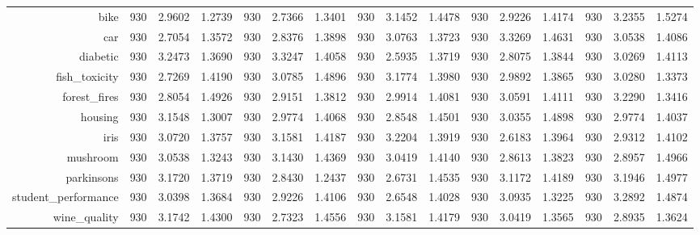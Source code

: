 \begin{table}[htbp]
{\begin{tabular}{rccccccccccccccc}
    bike  & 930   & 2.9602 & 1.2739 & 930   & \cellcolor[rgb]{ .776,  .937,  .808}\textcolor[rgb]{ 0,  .38,  0}{2.7366} & 1.3401 & 930   & 3.1452 & 1.4478 & 930   & 2.9226 & 1.4174 & 930   & 3.2355 & 1.5274 \\
    car   & 930   & \cellcolor[rgb]{ .776,  .937,  .808}\textcolor[rgb]{ 0,  .38,  0}{2.7054} & 1.3572 & 930   & 2.8376 & 1.3898 & 930   & 3.0763 & 1.3723 & 930   & 3.3269 & 1.4631 & 930   & 3.0538 & 1.4086 \\
    diabetic & 930   & 3.2473 & 1.3690 & 930   & 3.3247 & 1.4058 & 930   & \cellcolor[rgb]{ .776,  .937,  .808}\textcolor[rgb]{ 0,  .38,  0}{2.5935} & 1.3719 & 930   & 2.8075 & 1.3844 & 930   & 3.0269 & 1.4113 \\
    fish\_toxicity & 930   & \cellcolor[rgb]{ .776,  .937,  .808}\textcolor[rgb]{ 0,  .38,  0}{2.7269} & 1.4190 & 930   & 3.0785 & 1.4896 & 930   & 3.1774 & 1.3980 & 930   & 2.9892 & 1.3865 & 930   & 3.0280 & 1.3373 \\
    forest\_fires & 930   & \cellcolor[rgb]{ .776,  .937,  .808}\textcolor[rgb]{ 0,  .38,  0}{2.8054} & 1.4926 & 930   & 2.9151 & 1.3812 & 930   & 2.9914 & 1.4081 & 930   & 3.0591 & 1.4111 & 930   & 3.2290 & 1.3416 \\
    housing & 930   & 3.1548 & 1.3007 & 930   & 2.9774 & 1.4068 & 930   & \cellcolor[rgb]{ .776,  .937,  .808}\textcolor[rgb]{ 0,  .38,  0}{2.8548} & 1.4501 & 930   & 3.0355 & 1.4898 & 930   & 2.9774 & 1.4037 \\
    iris  & 930   & 3.0720 & 1.3757 & 930   & 3.1581 & 1.4187 & 930   & 3.2204 & 1.3919 & 930   & \cellcolor[rgb]{ .776,  .937,  .808}\textcolor[rgb]{ 0,  .38,  0}{2.6183} & 1.3964 & 930   & 2.9312 & 1.4102 \\
    mushroom & 930   & 3.0538 & 1.3243 & 930   & 3.1430 & 1.4369 & 930   & 3.0419 & 1.4140 & 930   & \cellcolor[rgb]{ .776,  .937,  .808}\textcolor[rgb]{ 0,  .38,  0}{2.8613} & 1.3823 & 930   & 2.8957 & 1.4966 \\
    parkinsons & 930   & 3.1720 & 1.3719 & 930   & 2.8430 & 1.2437 & 930   & \cellcolor[rgb]{ .776,  .937,  .808}\textcolor[rgb]{ 0,  .38,  0}{2.6731} & 1.4535 & 930   & 3.1172 & 1.4189 & 930   & 3.1946 & 1.4977 \\
    student\_performance & 930   & 3.0398 & 1.3684 & 930   & 2.9226 & 1.4106 & 930   & \cellcolor[rgb]{ .776,  .937,  .808}\textcolor[rgb]{ 0,  .38,  0}{2.6548} & 1.4028 & 930   & 3.0935 & 1.3225 & 930   & 3.2892 & 1.4874 \\
    wine\_quality & 930   & 3.1742 & 1.4300 & 930   & \cellcolor[rgb]{ .776,  .937,  .808}\textcolor[rgb]{ 0,  .38,  0}{2.7323} & 1.4556 & 930   & 3.1581 & 1.4179 & 930   & 3.0419 & 1.3565 & 930   & 2.8935 & 1.3624 \\

\end{tabular}}
\end{table}
